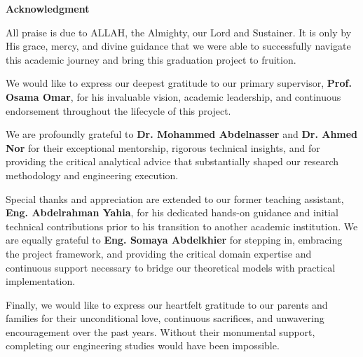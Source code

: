 \clearpage
\thispagestyle{empty}

\noindent
{\textbf{\Huge Acknowledgment}}
\vspace{1cm}

All praise is due to ALLAH, the Almighty, our Lord and Sustainer. It is only by His grace, mercy, and divine guidance that we were able to successfully navigate this academic journey and bring this graduation project to fruition.

We would like to express our deepest gratitude to our primary supervisor, \textbf{Prof. Osama Omar}, for his invaluable vision, academic leadership, and continuous endorsement throughout the lifecycle of this project.

We are profoundly grateful to \textbf{Dr. Mohammed Abdelnasser} and \textbf{Dr. Ahmed Nor} for their exceptional mentorship, rigorous technical insights, and for providing the critical analytical advice that substantially shaped our research methodology and engineering execution.

Special thanks and appreciation are extended to our former teaching assistant, \textbf{Eng. Abdelrahman Yahia}, for his dedicated hands-on guidance and initial technical contributions prior to his transition to another academic institution. We are equally grateful to \textbf{Eng. Somaya Abdelkhier} for stepping in, embracing the project framework, and providing the critical domain expertise and continuous support necessary to bridge our theoretical models with practical implementation.

Finally, we would like to express our heartfelt gratitude to our parents and families for their unconditional love, continuous sacrifices, and unwavering encouragement over the past years. Without their monumental support, completing our engineering studies would have been impossible.